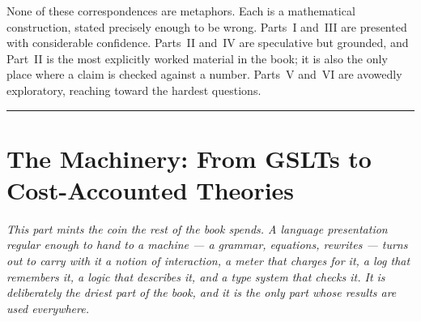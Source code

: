 \documentclass[12pt,openright,twoside]{book}
\theoremstyle{remark}
\theoremstyle{plain}
\theoremstyle{remark}
\theoremstyle{plain}
\theoremstyle{plain}
\begin{document}
None of these correspondences are metaphors.
Each is a mathematical construction, stated precisely enough to be wrong.
Parts~I and~III are presented with considerable confidence.
Parts~II and~IV are speculative but grounded, and Part~II is the most
explicitly worked material in the book; it is also the only place where a
claim is checked against a number.
Parts~V and~VI are avowedly exploratory, reaching toward the hardest
questions.

\bigskip
\noindent\hrule
\bigskip


\part{The Machinery: From GSLTs to Cost-Accounted Theories}
\label{part:machinery}

\vspace{1em}
\begin{mdframed}[backgroundcolor=remarkgray, linecolor=gray!60,
                 linewidth=1pt, topline=false, rightline=false,
                 bottomline=false]
\small\itshape
This part mints the coin the rest of the book spends.
A language presentation regular enough to hand to a machine --- a
grammar, equations, rewrites --- turns out to carry with it a notion of
interaction, a meter that charges for it, a log that remembers it, a
logic that describes it, and a type system that checks it.
It is deliberately the driest part of the book, and it is the only part
whose results are used everywhere.
\end{mdframed}

\bigskip

\end{document}
